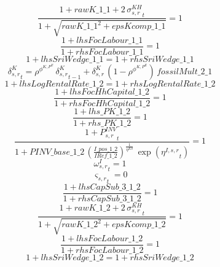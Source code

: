 \begin{dmath}
\frac{1+{rawK\_1\_1}+2\, {{\sigma^{KH}_{s,r}}}_{t}}{1+\sqrt{{rawK\_1\_1}^{2}+{epsKcomp\_1\_1}}}=1
\end{dmath}
\begin{dmath}
\frac{1+{lhsFocLabour\_1\_1}}{1+{rhsFocLabour\_1\_1}}=1
\end{dmath}
\begin{dmath}
1+{lhsSriWedge\_1\_1}=1+{rhsSriWedge\_1\_1}
\end{dmath}
\begin{dmath}
{{\delta^{K}_{s,r}}}_{t}={{\rho^{\phi^{K,P^E}}}}\, {{\delta^{K}_{s,r}}}_{t-1}+{{\delta^{K}_{s,r}}}\, \left(1-{{\rho^{\phi^{K,P^E}}}}\right)\, {fossilMult\_2\_1}
\end{dmath}
\begin{dmath}
1+{lhsLogRentalRate\_1\_2}=1+{rhsLogRentalRate\_1\_2}
\end{dmath}
\begin{dmath}
\frac{1+{lhsFocHhCapital\_1\_2}}{1+{rhsFocHhCapital\_1\_2}}=1
\end{dmath}
\begin{dmath}
\frac{1+{lhs\_PK\_1\_2}}{1+{rhs\_PK\_1\_2}}=1
\end{dmath}
\begin{dmath}
\frac{1+{{P^{INV}_{s,r}}}_{t}}{1+{PINV\_base\_1\_2}\, \left(\frac{{I\_pos\_1\_2}}{{IRef\_1\_2}}\right)^{\frac{1}{{{\eta^{KS}}}}}\, \exp\left({{\eta^{I,s,r}}}_{t}\right)}=1
\end{dmath}
\begin{dmath}
{{\omega^I_{s,r}}}_{t}=1
\end{dmath}
\begin{dmath}
{{\varsigma_{s,r}}}_{t}=0
\end{dmath}
\begin{dmath}
\frac{1+{lhsCapSub\_3\_1\_2}}{1+{rhsCapSub\_3\_1\_2}}=1
\end{dmath}
\begin{dmath}
\frac{1+{rawK\_1\_2}+2\, {{\sigma^{KH}_{s,r}}}_{t}}{1+\sqrt{{rawK\_1\_2}^{2}+{epsKcomp\_1\_2}}}=1
\end{dmath}
\begin{dmath}
\frac{1+{lhsFocLabour\_1\_2}}{1+{rhsFocLabour\_1\_2}}=1
\end{dmath}
\begin{dmath}
1+{lhsSriWedge\_1\_2}=1+{rhsSriWedge\_1\_2}
\end{dmath}
